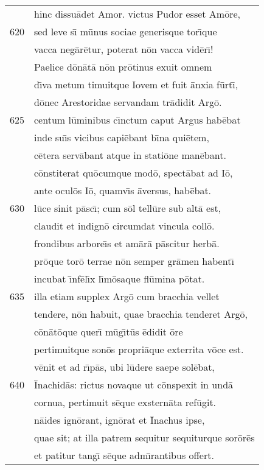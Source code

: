 \documentclass[paper=6in:9in,pagesize=pdftex,
               headinclude=on,footinclude=on,12pt]{scrbook}
\begin{document}
\begin{longtable}[p]{ r l }
 & hinc dissu\=adet Amor. victus Pudor esset Am\=ore,\\ 
620 & sed leve s\={\i} m\=unus sociae generisque tor\={\i}que\\ 
 & vacca neg\=ar\=etur, poterat n\=on vacca vid\=er\={\i}!\\ 
 & \indent Paelice d\=on\=at\=a n\=on pr\=otinus exuit omnem\\ 
 & d\={\i}va metum timuitque Iovem et fuit \=anxia f\=urt\={\i},\\ 
 & d\=onec Arestoridae servandam tr\=adidit Arg\=o.\\ 
625 & centum l\=uminibus c\={\i}nctum caput Argus hab\=ebat\\ 
 & inde su\={\i}s vicibus capi\=ebant b\={\i}na qui\=etem,\\ 
 & c\=etera serv\=abant atque in stati\=one man\=ebant.\\ 
 & c\=onstiterat qu\=ocumque mod\=o, spect\=abat ad I\=o,\\ 
 & ante ocul\=os I\=o, quamv\={\i}s \=aversus, hab\=ebat.\\ 
630 & l\=uce sinit p\=asc\={\i}; cum s\=ol tell\=ure sub alt\=a est,\\ 
 & claudit et indign\=o circumdat vincula coll\=o.\\ 
 & frondibus arbore\={\i}s et am\=ar\=a p\=ascitur herb\=a.\\ 
 & pr\=oque tor\=o terrae n\=on semper gr\=amen habent\={\i}\\ 
 & incubat \={\i}nf\=el\={\i}x l\={\i}m\=osaque fl\=umina p\=otat.\\ 
635 & illa etiam supplex Arg\=o cum bracchia vellet\\ 
 & tendere, n\=on habuit, quae bracchia tenderet Arg\=o,\\ 
 & c\=on\=at\=oque quer\={\i} m\=ug\={\i}t\=us \=edidit \=ore\\ 
 & pertimuitque son\=os propri\=aque exterrita v\=oce est.\\ 
 & v\=enit et ad r\={\i}p\=as, ubi l\=udere saepe sol\=ebat,\\ 
640 & \=Inachid\=as: rictus novaque ut c\=onspexit in und\=a\\ 
 & cornua, pertimuit s\=eque exstern\=ata ref\=ugit.\\ 
 & n\=aides ign\=orant, ign\=orat et \=Inachus ipse,\\ 
 & quae sit; at illa patrem sequitur sequiturque sor\=or\=es\\ 
 & et patitur tang\={\i} s\=eque adm\={\i}rantibus offert.\\ 

\end{longtable}
\end{document}
